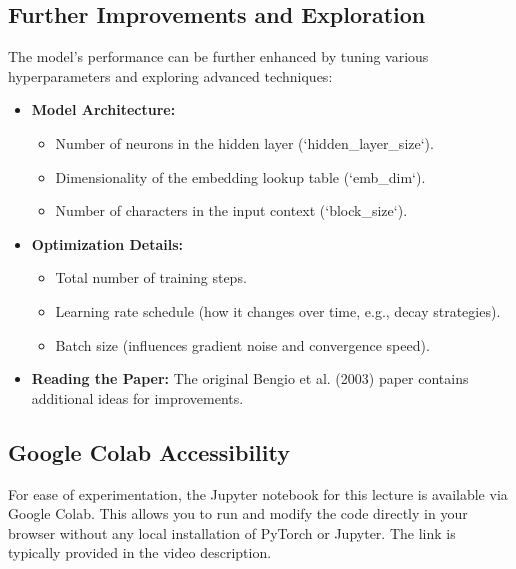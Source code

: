 \subsection{Further Improvements and Exploration}
The model's performance can be further enhanced by tuning various hyperparameters and exploring advanced techniques:
\begin{itemize}
    \item \textbf{Model Architecture:}
    \begin{itemize}
        \item Number of neurons in the hidden layer (`hidden_layer_size`).
        \item Dimensionality of the embedding lookup table (`emb_dim`).
        \item Number of characters in the input context (`block_size`).
    \end{itemize}
    \item \textbf{Optimization Details:}
    \begin{itemize}
        \item Total number of training steps.
        \item Learning rate schedule (how it changes over time, e.g., decay strategies).
        \item Batch size (influences gradient noise and convergence speed).
    \end{itemize}
    \item \textbf{Reading the Paper:} The original Bengio et al. (2003) paper contains additional ideas for improvements.
\end{itemize}

\subsection{Google Colab Accessibility}
For ease of experimentation, the Jupyter notebook for this lecture is available via Google Colab. This allows you to run and modify the code directly in your browser without any local installation of PyTorch or Jupyter. The link is typically provided in the video description.